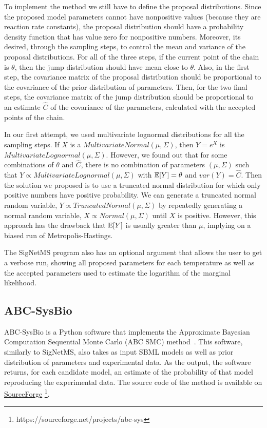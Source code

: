 To implement the method we still have to define the proposal 
distributions. Since the proposed model parameters cannot have 
nonpositive values (because they are reaction rate constants), the 
proposal distribution should have a probability density function that 
has value zero for nonpositive numbers. Moreover, its desired, through 
the sampling steps, to control the mean and variance of the proposal 
distributions. For all of the three steps, if the current point of the
chain is $\theta$, then the jump distribution should have mean close
to $\theta$. Also, in the first step, the covariance matrix  of the 
proposal distribution should be proportional to the covariance of 
the prior distribution of parameters. Then, for the two final steps, the 
covariance matrix of the jump distribution should be proportional to an
estimate $\hat{C}$ of the covariance of the parameters, calculated with 
the accepted points of the chain.

In our first attempt, we used multivariate lognormal distributions for 
all the sampling steps. If $X$ is a $MultivariateNormal (\mu, \Sigma)$, 
then $Y = e^{X}$ is $MultivariateLognormal (\mu, \Sigma)$. However, we 
found out that for some combinations of $\theta$ and $\hat{C}$, there 
is no combination of parameters $(\mu, \Sigma)$ such that $Y \propto 
MultivariateLognormal (\mu, \Sigma)$ with $\mathbb{E}[Y] = \theta$ and
$var(Y) = \hat{C}$. Then the solution we proposed is to use a truncated 
normal distribution for which only positive numbers have positive 
probability. We can generate a truncated normal random variable, 
$Y \propto TruncatedNormal (\mu, \Sigma)$ by 
repeatedly generating a normal random variable, $X \propto Normal(\mu, 
\Sigma)$ until $X$ is positive. However, this approach has the drawback 
that  $\mathbb{E}[Y]$ is usually greater than $\mu$, implying on a 
biased run of Metropolis-Hastings.

The SigNetMS program also has an optional argument that allows the user
to get a verbose run, showing all proposed parameters for each 
temperature as well as the accepted parameters used to estimate the 
logarithm of the marginal likelihood. 

\subsection{ABC-SysBio}
ABC-SysBio is a Python software that implements the Approximate Bayesian
Computation Sequential Monte Carlo (ABC SMC) method~\cite{Liepe2010}. 
This software, similarly to SigNetMS, also takes as input SBML models as 
well as prior distribution of parameters and experimental data. As the 
output, the software returns, for each candidate model, an estimate of 
the probability of that model reproducing the experimental data. The 
source code of the method is available on 
\href{https://sourceforge.net/projects/abc-sysbio/files/}{SourceForge}
\footnote{https://sourceforge.net/projects/abc-sys}.


